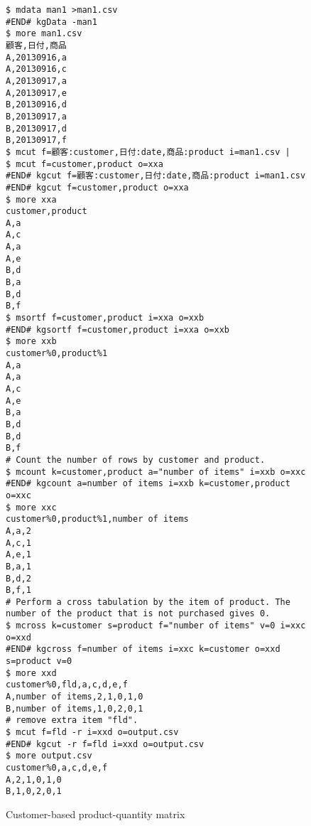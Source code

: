 \begin{figure}[htbp]
\begin{Verbatim}[baselinestretch=0.7,frame=single]
$ mdata man1 >man1.csv
#END# kgData -man1
$ more man1.csv
顧客,日付,商品
A,20130916,a
A,20130916,c
A,20130917,a
A,20130917,e
B,20130916,d
B,20130917,a
B,20130917,d
B,20130917,f
$ mcut f=顧客:customer,日付:date,商品:product i=man1.csv |
$ mcut f=customer,product o=xxa
#END# kgcut f=顧客:customer,日付:date,商品:product i=man1.csv
#END# kgcut f=customer,product o=xxa
$ more xxa
customer,product
A,a
A,c
A,a
A,e
B,d
B,a
B,d
B,f
$ msortf f=customer,product i=xxa o=xxb
#END# kgsortf f=customer,product i=xxa o=xxb
$ more xxb
customer%0,product%1
A,a
A,a
A,c
A,e
B,a
B,d
B,d
B,f
# Count the number of rows by customer and product.
$ mcount k=customer,product a="number of items" i=xxb o=xxc
#END# kgcount a=number of items i=xxb k=customer,product o=xxc
$ more xxc
customer%0,product%1,number of items
A,a,2
A,c,1
A,e,1
B,a,1
B,d,2
B,f,1
# Perform a cross tabulation by the item of product. The number of the product that is not purchased gives 0.
$ mcross k=customer s=product f="number of items" v=0 i=xxc o=xxd
#END# kgcross f=number of items i=xxc k=customer o=xxd s=product v=0
$ more xxd
customer%0,fld,a,c,d,e,f
A,number of items,2,1,0,1,0
B,number of items,1,0,2,0,1
# remove extra item "fld".
$ mcut f=fld -r i=xxd o=output.csv
#END# kgcut -r f=fld i=xxd o=output.csv
$ more output.csv
customer%0,a,c,d,e,f
A,2,1,0,1,0
B,1,0,2,0,1
\end{Verbatim}
\caption{Customer-based product-quantity matrix\label{fig:abstract2_1}}
\end{figure}
